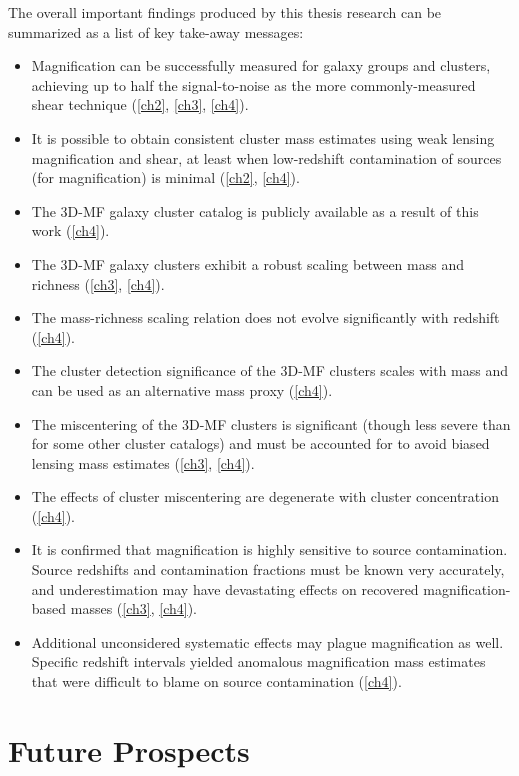 The overall important findings produced by this thesis research can be summarized as a list of key take-away messages:
\begin{itemize}
\item Magnification can be successfully measured for galaxy groups and clusters, achieving up to half the signal-to-noise as the more commonly-measured shear technique (\autoref{ch2}, \autoref{ch3}, \autoref{ch4}).
\item It is possible to obtain consistent cluster mass estimates using weak lensing magnification and shear, at least when low-redshift contamination of sources (for magnification) is minimal (\autoref{ch2}, \autoref{ch4}).
\item The \ac{3D-MF} galaxy cluster catalog is publicly available as a result of this work (\autoref{ch4}).
\item The \ac{3D-MF} galaxy clusters exhibit a robust scaling between mass and richness (\autoref{ch3}, \autoref{ch4}).
\item The mass-richness scaling relation does not evolve significantly with redshift (\autoref{ch4}).
\item The cluster detection significance of the \ac{3D-MF} clusters scales with mass and can be used as an alternative mass proxy (\autoref{ch4}).
\item The miscentering of the \ac{3D-MF} clusters is significant (though less severe than for some other cluster catalogs) and must be accounted for to avoid biased lensing mass estimates (\autoref{ch3}, \autoref{ch4}).
\item The effects of cluster miscentering are degenerate with cluster concentration (\autoref{ch4}).
\item It is confirmed that magnification is highly sensitive to source contamination. Source redshifts and contamination fractions must be known very accurately, and underestimation may have devastating effects on recovered magnification-based masses (\autoref{ch3}, \autoref{ch4}).
\item Additional unconsidered systematic effects may plague magnification as well. Specific redshift intervals yielded anomalous magnification mass estimates that were difficult to blame on source contamination (\autoref{ch4}).
\end{itemize}

\section{Future Prospects}
\label{sec:future}

